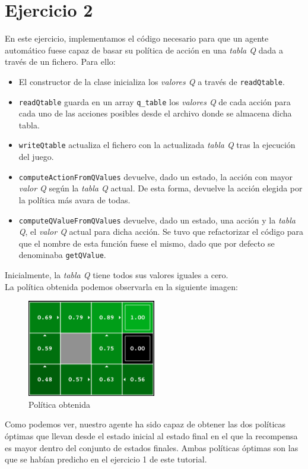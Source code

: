 \documentclass[12pt]{article}
\begin{document}


\newpage
\section{Ejercicio 2}

En este ejercicio, implementamos el código necesario para que un agente automático fuese capaz de basar su política de acción en una \textit{tabla Q} dada a través de un fichero. Para ello:

\begin{itemize}
    \item El constructor de la clase inicializa los \textit{valores Q} a través de \texttt{readQtable}.
    \item \texttt{readQtable} guarda en un array \texttt{q\_table} los \textit{valores Q} de cada acción para cada uno de las acciones posibles desde el archivo donde se almacena dicha tabla.
    \item \texttt{writeQtable} actualiza el fichero con la actualizada \textit{tabla Q} tras la ejecución del juego.
    \item \texttt{computeActionFromQValues} devuelve, dado un estado, la acción con mayor \textit{valor Q} según la \textit{tabla Q} actual. De esta forma, devuelve la acción elegida por la política más avara de todas.
    \item \texttt{computeQValueFromQValues} devuelve, dado un estado, una acción y la \textit{tabla Q}, el \textit{valor Q} actual para dicha acción. Se tuvo que refactorizar el código para que el nombre de esta función fuese el mismo, dado que por defecto se denominaba \texttt{getQValue}.
\end{itemize}
Inicialmente, la \textit{tabla Q} tiene todos sus valores iguales a cero.\\
La política obtenida podemos observarla en la siguiente imagen:

\begin{figure}[h]
    \centering
    \includegraphics[width=0.5\textwidth]{policy_det}
    \caption{Política obtenida}
\end{figure}
    Como podemos ver, nuestro agente ha sido capaz de obtener las dos políticas óptimas que llevan desde el estado inicial al estado final en el que la recompensa es mayor dentro del conjunto de estados finales. Ambas políticas óptimas son las que se habían predicho en el ejercicio 1 de este tutorial.
\newpage
\end{document}
